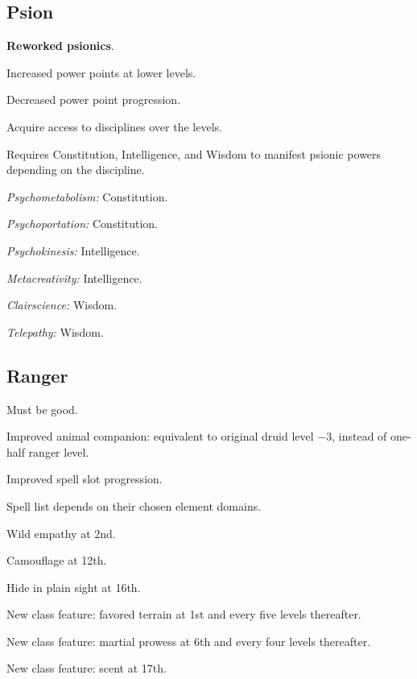 \subsection{Psion}
\begin{itemize*}
\item \textbf{Reworked psionics}.
\item Increased power points at lower levels.
\item Decreased power point progression.
\item Acquire access to disciplines over the levels.
\item Requires Constitution, Intelligence, and Wisdom to manifest psionic powers depending on the discipline.
	\begin{itemize*}
	\item \textit{Psychometabolism:} Constitution.
	\item \textit{Psychoportation:} Constitution.
	\item \textit{Psychokinesis:} Intelligence.
	\item \textit{Metacreativity:} Intelligence.
	\item \textit{Clairscience:} Wisdom.
	\item \textit{Telepathy:} Wisdom.
	\end{itemize*}
\end{itemize*}


\subsection{Ranger}
\begin{itemize*}
\item Must be good.
\item Improved animal companion: equivalent to original druid level $-3$, instead of one-half ranger level.
\item Improved spell slot progression.
\item Spell list depends on their chosen element domains.
\item Wild empathy at 2nd.
\item Camouflage at 12th.
\item Hide in plain sight at 16th.
\item New class feature: favored terrain at 1st and every five levels thereafter.
\item New class feature: martial prowess at 6th and every four levels thereafter.
\item New class feature: scent at 17th.
\end{itemize*}

